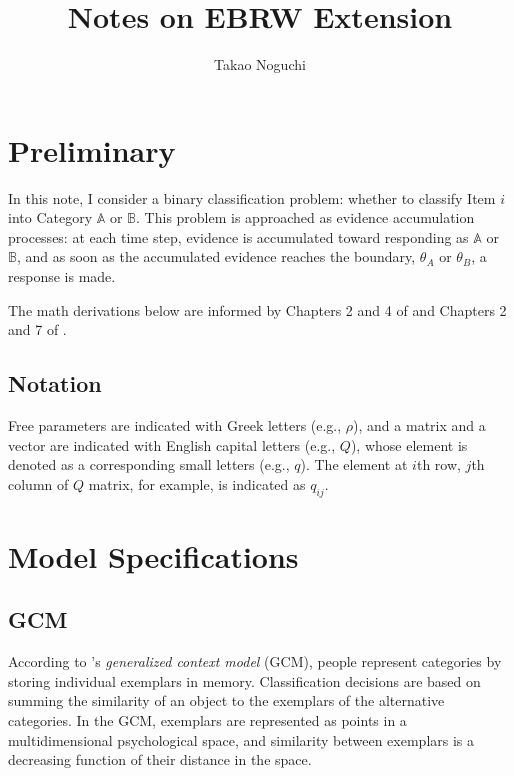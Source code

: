 \documentclass[doc]{apa6}
\title{Notes on EBRW Extension}
\author{Takao Noguchi}
\affiliation{Department of Experimental Psychology, University College London}
\begin{document}
\maketitle


\section{Preliminary}

In this note, I consider a binary classification problem: whether to classify Item $i$ into Category
$\mathbb{A}$ or $\mathbb{B}$. This problem is approached as evidence accumulation processes: at each
time step, evidence is accumulated toward responding as $\mathbb{A}$ or $\mathbb{B}$, and as soon as
the accumulated evidence reaches the boundary, $\theta_{A}$ or $\theta_{B}$, a response is made.

The math derivations below are informed by Chapters 2 and 4 of \textcite{Kijima1997a} and Chapters 2
and 7 of \textcite{Bhat2002a}.

\subsection{Notation}

Free parameters are indicated with Greek letters (e.g., $\rho$), and a matrix and a vector are
indicated with English capital letters (e.g., $Q$), whose element is denoted as a corresponding
small letters (e.g., $q$). The element at $i$th row, $j$th column of $Q$ matrix, for example, is
indicated as $q_{ij}$.


\section{Model Specifications}

\subsection{GCM}

According to \textcite{Nosofsky1986a}'s \emph{generalized context model} (GCM), people represent
categories by storing individual exemplars in memory. Classification decisions are based on summing
the similarity of an object to the exemplars of the alternative categories. In the GCM, exemplars
are represented as points in a multidimensional psychological space, and similarity between
exemplars is a decreasing function of their distance in the space.
\end{document}
